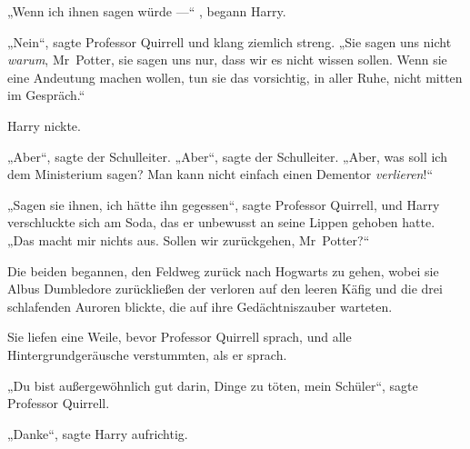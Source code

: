 „Wenn ich ihnen sagen würde —“ , begann Harry.

„Nein“, sagte Professor Quirrell und klang ziemlich streng.
„Sie sagen uns nicht \emph{warum}, Mr~Potter, sie sagen uns nur, dass wir es nicht wissen sollen. Wenn sie eine Andeutung machen wollen, tun sie das vorsichtig, in aller Ruhe, nicht mitten im Gespräch.“

Harry nickte.

„Aber“, sagte der Schulleiter.
„Aber“, sagte der Schulleiter.
„Aber, was soll ich dem Ministerium sagen? Man kann nicht einfach einen Dementor \emph{verlieren}!“

„Sagen sie ihnen, ich hätte ihn gegessen“, sagte Professor Quirrell, und Harry verschluckte sich am Soda, das er unbewusst an seine Lippen gehoben hatte.
„Das macht mir nichts aus. Sollen wir zurückgehen, Mr~Potter?“

Die beiden begannen, den Feldweg zurück nach Hogwarts zu gehen, wobei sie Albus Dumbledore zurückließen der verloren auf den leeren Käfig und die drei schlafenden Auroren blickte, die auf ihre Gedächtniszauber warteten.


Sie liefen eine Weile, bevor Professor Quirrell sprach, und alle Hintergrundgeräusche verstummten, als er sprach.

„Du bist außergewöhnlich gut darin, Dinge zu töten, mein Schüler“, sagte Professor Quirrell.

„Danke“, sagte Harry aufrichtig.

